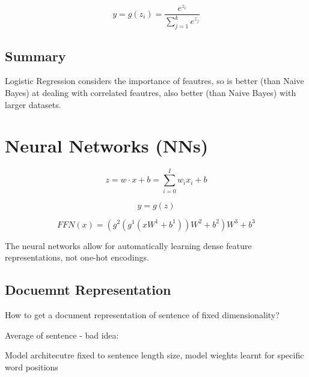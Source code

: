 \documentclass[11pt]{article}
\begin{document}
\begin{equation*}
    y=g(z_i)=\frac{e^{z_i}}{\sum^k_{j=1}e^{z_j}}
\end{equation*}

\subsection{Summary}

Logistic Regression considers the importance of feautres, so is better (than Naive Bayes) at dealing with correlated feautres, also better (than Naive Bayes) with larger datasets.

\section{Neural Networks (NNs)}

\begin{definition}
    \begin{equation*}
        z = w \cdot x + b = \sum^I_{i=0}w_ix_i + b
    \end{equation*}
\end{definition}

\begin{definition}
    \begin{equation*}
        y = g(z)
    \end{equation*}
\end{definition}

\begin{definition}
    \begin{equation*}
        FFN(x) = (g^2(g^1(xW^1+b^1))W^2 + b^2)W^3 + b^3
    \end{equation*}
\end{definition}

The neural networks allow for automatically learning dense feature representations, not one-hot encodings.

\subsection{Docuemnt Representation}

How to get a document representation of sentence of
fixed dimensionality?

Average of sentence - bad idea:
    
Model architecutre fixed to sentence length size, model wieghts learnt for specific word positions
\end{document}
